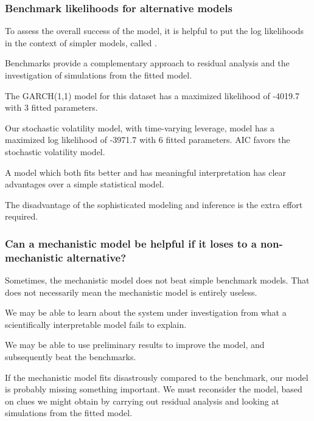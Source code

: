 \documentclass{beamer}\usepackage[]{graphicx}\usepackage[]{color}
\begin{document}
\begin{frame}[fragile]

\frametitle{Benchmark likelihoods for alternative models}

\bi

\item To assess the overall success of the model, it is helpful to put the log likelihoods in the context of simpler models, called .

\item Benchmarks provide a complementary approach to residual analysis and the investigation of simulations from the fitted model.





\item The GARCH(1,1) model for this dataset has a maximized likelihood of -4019.7 with 3 fitted parameters.

\item Our stochastic volatility model, with time-varying leverage, model has a maximized log likelihood of -3971.7 with 6 fitted parameters.  AIC favors the stochastic volatility model.

\item A model which both fits better and has meaningful interpretation has clear advantages over a simple statistical model. 

\item The disadvantage of the sophisticated modeling and inference is the extra effort required.

\ei

\end{frame}

\begin{frame}[fragile]

\frametitle{Can a mechanistic model be helpful if it loses to a non-mechanistic alternative?}

\bi

\item Sometimes, the mechanistic model does not beat simple benchmark models. That does not necessarily mean the mechanistic model is entirely useless. 

\item We may be able to learn about the system under investigation from what a scientifically interpretable model fails to explain.

\item We may be able to use preliminary results to improve the model, and subsequently beat the benchmarks.

\item If the mechanistic model fits disastrously compared to the benchmark, our model is probably missing something important. We must reconsider the model, based on clues we might obtain by carrying out residual analysis and looking at simulations from the fitted model.

\ei

\end{frame}
\end{document}
